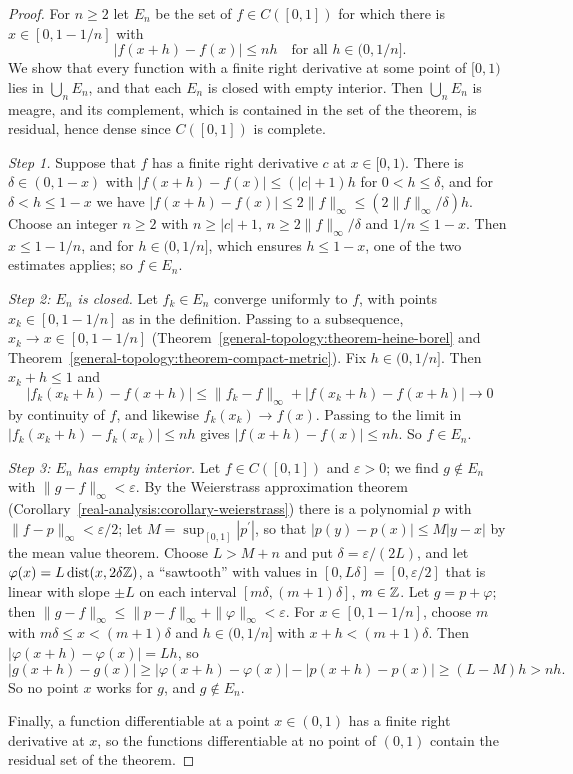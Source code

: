 \begin{proof}
For $n \geq 2$ let $E_n$ be the set of $f \in C([0, 1])$ for which there is $x \in [0, 1 - 1/n]$ with
\[
|f(x + h) - f(x)| \leq nh \quad\text{for all } h \in (0, 1/n].
\]
We show that every function with a finite right derivative at some point of $[0, 1)$ lies in $\bigcup_nE_n$, and that each $E_n$ is closed with empty interior. Then $\bigcup_nE_n$ is meagre, and
its complement, which is contained in the set of the theorem, is residual, hence dense since $C([0, 1])$ is complete.

\emph{Step 1.} Suppose that $f$ has a finite right derivative $c$ at $x \in [0, 1)$. There is $\delta \in (0, 1 - x)$ with $|f(x + h) - f(x)| \leq (|c| + 1)h$ for $0 < h \leq \delta$, and for
$\delta < h \leq 1 - x$ we have $|f(x + h) - f(x)| \leq 2\|f\|_\infty \leq (2\|f\|_\infty/\delta)h$. Choose an integer $n \geq 2$ with $n \geq |c| + 1$, $n \geq 2\|f\|_\infty/\delta$ and
$1/n \leq 1 - x$. Then $x \leq 1 - 1/n$, and for $h \in (0, 1/n]$, which ensures $h \leq 1 - x$, one of the two estimates applies; so $f \in E_n$.

\emph{Step 2: $E_n$ is closed.} Let $f_k \in E_n$ converge uniformly to $f$, with points $x_k \in [0, 1 - 1/n]$ as in the definition. Passing to a subsequence, $x_k \to x \in [0, 1 - 1/n]$
(Theorem~\ref{general-topology:theorem-heine-borel} and Theorem~\ref{general-topology:theorem-compact-metric}). Fix $h \in (0, 1/n]$. Then $x_k + h \leq 1$ and
\[
|f_k(x_k + h) - f(x + h)| \leq \|f_k - f\|_\infty + |f(x_k + h) - f(x + h)| \to 0
\]
by continuity of $f$, and likewise $f_k(x_k) \to f(x)$. Passing to the limit in $|f_k(x_k + h) - f_k(x_k)| \leq nh$ gives $|f(x + h) - f(x)| \leq nh$. So $f \in E_n$.

\emph{Step 3: $E_n$ has empty interior.} Let $f \in C([0, 1])$ and $\varepsilon > 0$; we find $g \notin E_n$ with $\|g - f\|_\infty < \varepsilon$. By the Weierstrass approximation theorem
(Corollary~\ref{real-analysis:corollary-weierstrass}) there is a polynomial $p$ with $\|f - p\|_\infty < \varepsilon/2$; let $M = \sup_{[0, 1]}|p^{\prime}|$, so that $|p(y) - p(x)| \leq M|y - x|$ by the
mean value theorem. Choose $L > M + n$ and put $\delta = \varepsilon/(2L)$, and let $\varphi(x) = L\operatorname{dist}(x, 2\delta\mathbb{Z})$, a ``sawtooth'' with values in $[0, L\delta] = [0, \varepsilon/2]$
that is linear with slope $\pm L$ on each interval $[m\delta, (m + 1)\delta]$, $m \in \mathbb{Z}$. Let $g = p + \varphi$; then $\|g - f\|_\infty \leq \|p - f\|_\infty + \|\varphi\|_\infty < \varepsilon$. For
$x \in [0, 1 - 1/n]$, choose $m$ with $m\delta \leq x < (m + 1)\delta$ and $h \in (0, 1/n]$ with $x + h < (m + 1)\delta$. Then $|\varphi(x + h) - \varphi(x)| = Lh$, so
\[
|g(x + h) - g(x)| \geq |\varphi(x + h) - \varphi(x)| - |p(x + h) - p(x)| \geq (L - M)h > nh .
\]
So no point $x$ works for $g$, and $g \notin E_n$.

Finally, a function differentiable at a point $x \in (0, 1)$ has a finite right derivative at $x$, so the functions differentiable at no point of $(0, 1)$ contain the residual set of the theorem.
\end{proof}

